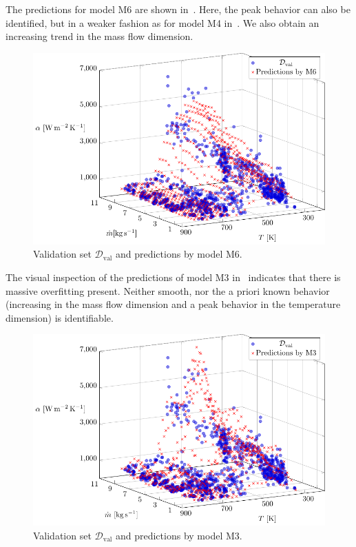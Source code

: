 The predictions for model M6 are shown in~. Here, the peak behavior can also be identified, but in a weaker fashion as for model M4 in~. We also obtain an increasing trend in the mass flow dimension. 

\begin{figure}[H]
	\centering
	\includegraphics[width=\columnwidth]{graphics/pgfplots/cha5/Ebner/M6.pdf}
	\caption{Validation set $\mathcal{D}_{\text{val}}$ and predictions by model M6.}
	\label{fig:ebner-M6}
\end{figure}
%
The visual inspection of the predictions of model M3 in~ indicates that there is massive overfitting present. Neither smooth, nor the a priori known behavior (increasing in the mass flow dimension and a peak behavior in the temperature dimension) is identifiable.  

\begin{figure}[H]
	\centering
	\includegraphics[width=\columnwidth]{graphics/pgfplots/cha5/Ebner/M3.pdf}
	\caption{Validation set $\mathcal{D}_{\text{val}}$ and predictions by model M3.}
	\label{fig:ebner-M3}
\end{figure}

